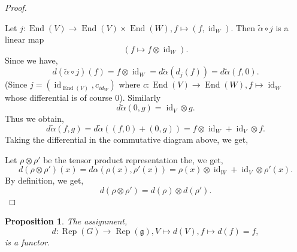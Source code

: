 \documentclass[10pt]{article}
\newtheorem{proposition}{Proposition}[section]
\numberwithin{equation}{theorem}
\DeclareMathOperator{\End}{End}
\DeclareMathOperator{\GL}{GL}
\DeclareMathOperator{\Rep}{Rep}
\DeclareMathOperator{\id}{id}
\newcommand{\g}[0]{\mathfrak{g}}
\newcommand{\gl}[0]{\mathfrak{gl}}
\begin{document}
\begin{proof}
\begin{center}
  \end{center}
  Let $j:\End(V)\to\End(V)\times \End(W), f\mapsto(f,\id_W)$. Then $\tilde{\alpha}\circ j$ is a linear map 
  \begin{equation*}
    (f\mapsto f\otimes \id_W).
  \end{equation*}
  Since we have,
  \begin{equation*}
    d(\tilde{\alpha}\circ j)(f) = f\otimes \id_W = d\tilde{\alpha}(d_j(f)) = d\tilde{\alpha}(f,0).
  \end{equation*}
  (Since $j=(\id_{\End(V)},c_{id_W})$ where $c:\End(V)\to\End(W), f\mapsto \id_W$ whose differential is of course $0$). Similarly
  \begin{equation*}
    d\tilde{\alpha}(0,g) = \id_V\otimes g.
  \end{equation*}
  Thus we obtain,
  \begin{equation*}
    d\tilde{\alpha}(f,g) = d\tilde{\alpha}((f,0)+(0,g)) = f\otimes \id_W+\id_V\otimes f.
  \end{equation*}
  Taking the differential in the commutative diagram above, we get, 
  \begin{center}
  \end{center}
  Let $\rho\otimes \rho'$ be the tensor product representation the, we get,
  \begin{equation*}
    d(\rho\otimes\rho')(x) = d\alpha(\rho(x),\rho'(x)) = \rho(x)\otimes \id_W+\id_V\otimes \rho'(x).
  \end{equation*}
  By definition, we get,
  \begin{equation*}
    d(\rho\otimes\rho') = d(\rho)\otimes d(\rho').
  \end{equation*}
\end{proof}
\begin{proposition}
  \label{proposition_5_12}
  The assignment, 
  \begin{equation*}
    d:\Rep(G)\to\Rep(\g), V\mapsto d(V), f\mapsto d(f) = f,
  \end{equation*}
  is a functor.
\end{proposition}
\end{document}
